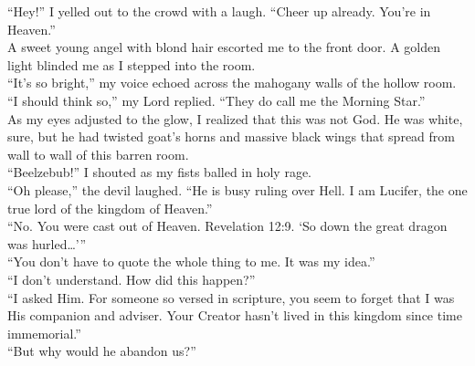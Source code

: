 \enquote{Hey!} I yelled out to the crowd with a laugh. \enquote{Cheer up already.  You're in Heaven.}\\



A sweet young angel with blond hair escorted me to the front door. A golden light blinded me as I stepped into the room.\\



\enquote{It's so bright,} my voice echoed across the mahogany walls of the hollow room. \\



\enquote{I should think so,} my Lord replied. \enquote{They do call me the Morning Star.}\\



As my eyes adjusted to the glow, I realized that this was not God. He was white, sure, but he had twisted goat's horns and massive black wings that spread from wall to wall of this barren room.\\



\enquote{Beelzebub!} I shouted as my fists balled in holy rage.\\



\enquote{Oh please,} the devil laughed. \enquote{He is busy ruling over Hell. I am Lucifer, the one true lord of the kingdom of Heaven.}\\



\enquote{No. You were cast out of Heaven. Revelation 12:9. \enquote{So down the great dragon was hurled\dots}}\\



\enquote{You don't have to quote the whole thing to me. It was my idea.}\\



\enquote{I don't understand. How did this happen?}\\



\enquote{I asked Him. For someone so versed in scripture, you seem to forget that I was His companion and adviser. Your Creator hasn't lived in this kingdom since time immemorial.}\\



\enquote{But why would he abandon us?}\\



